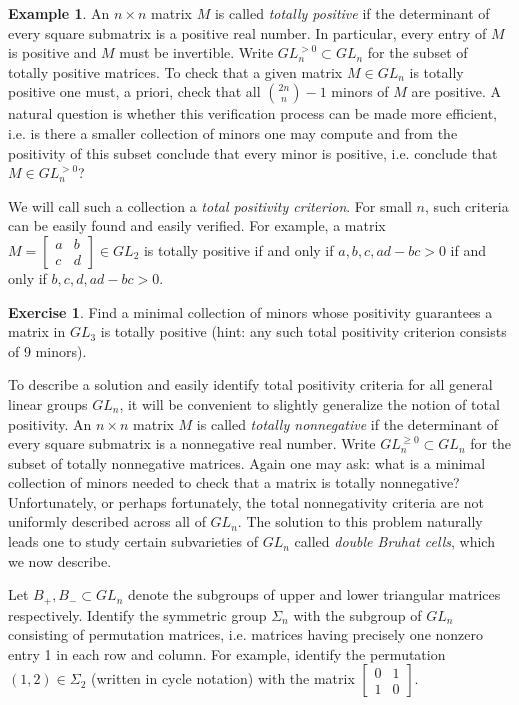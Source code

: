 \documentclass{amsart}
\theoremstyle{definition}
\newtheorem{example}[theorem]{Example}
\newtheorem{subexercise}{Exercise}[theorem]
\theoremstyle{remark}
\numberwithin{equation}{section}
\begin{document}
  \begin{example}\label{example:total positivity}
    An $n\times n$ matrix $M$ is called \emph{totally positive} if the determinant of every square submatrix is a positive real number.  In particular, every entry of $M$ is positive and $M$ must be invertible.  Write $GL_n^{>0}\subset GL_n$ for the subset of totally positive matrices.  To check that a given matrix $M\in GL_n$ is totally positive one must, a priori, check that all ${2n\choose n}-1$ minors of $M$ are positive.  A natural question is whether this verification process can be made more efficient, i.e. is there a smaller collection of minors one may compute and from the positivity of this subset conclude that every minor is positive, i.e. conclude that $M\in GL_n^{>0}$?

    We will call such a collection a \emph{total positivity criterion}.  For small $n$, such criteria can be easily found and easily verified.  For example, a matrix $M=\left[\begin{array}{cc} a & b\\ c & d\end{array}\right]\in GL_2$ is totally positive if and only if $a,b,c,ad-bc>0$ if and only if $b,c,d,ad-bc>0$.
    \begin{subexercise}
      Find a minimal collection of minors whose positivity guarantees a matrix in $GL_3$ is totally positive (hint: any such total positivity criterion consists of 9 minors).
    \end{subexercise}

    To describe a solution and easily identify total positivity criteria for all general linear groups $GL_n$, it will be convenient to slightly generalize the notion of total positivity.  An $n\times n$ matrix $M$ is called \emph{totally nonnegative} if the determinant of every square submatrix is a nonnegative real number.  Write $GL_n^{\ge0}\subset GL_n$ for the subset of totally nonnegative matrices.  Again one may ask: what is a minimal collection of minors needed to check that a matrix is totally nonnegative?  Unfortunately, or perhaps fortunately, the total nonnegativity criteria are not uniformly described across all of $GL_n$.  The solution to this problem naturally leads one to study certain subvarieties of $GL_n$ called \emph{double Bruhat cells}, which we now describe.

    Let $B_+,B_-\subset GL_n$ denote the subgroups of upper and lower triangular matrices respectively.  Identify the symmetric group $\Sigma_n$ with the subgroup of $GL_n$ consisting of permutation matrices, i.e. matrices having precisely one nonzero entry 1 in each row and column.  For example, identify the permutation $(1,2)\in\Sigma_2$ (written in cycle notation) with the matrix $\left[\begin{array}{cc}0 & 1\\ 1 & 0\end{array}\right]$.  


\end{example}
\end{document}
